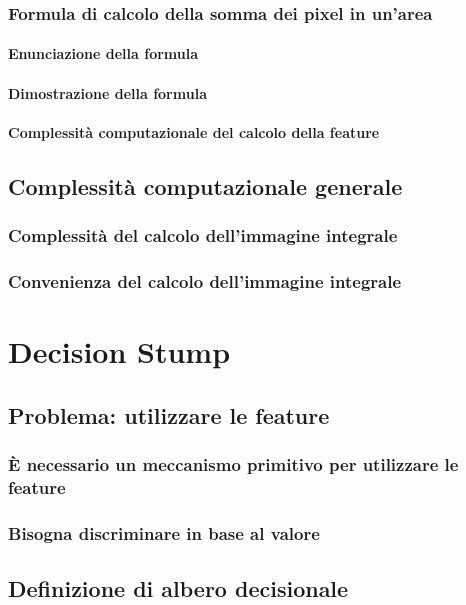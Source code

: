             \subsubsection{Formula di calcolo della somma dei pixel in un'area}
                \paragraph{Enunciazione della formula}
                \paragraph{Dimostrazione della formula}
                \paragraph{Complessità computazionale del calcolo della feature}
        \subsection{Complessità computazionale generale}
            \subsubsection{Complessità del calcolo dell'immagine integrale}
            \subsubsection{Convenienza del calcolo dell'immagine integrale}
    \section{Decision Stump}
    \label{sec:decision_stump}
        \subsection{Problema: utilizzare le feature}
            \subsubsection{È necessario un meccanismo primitivo per utilizzare le feature}
            \subsubsection{Bisogna discriminare in base al valore}
        \subsection{Definizione di albero decisionale}
